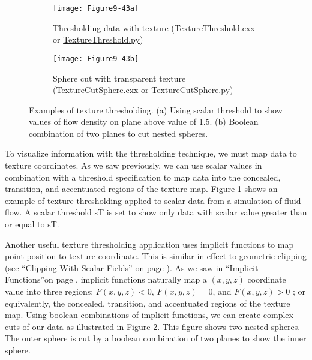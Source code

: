\begin{figure}[htb]
	\begin{subfigure}[h]{0.48\linewidth}
		\texttt{[image: Figure9-43a]}
		\captionsetup{justification=centering}
		\caption{Thresholding data with texture (\href{https://lorensen.github.io/VTKExamples/site/Cxx/Texture/TextureThreshold/}{TextureThreshold.cxx} or \href{https://lorensen.github.io/VTKExamples/site/Python/Texture/TextureThreshold/}{TextureThreshold.py})}
		\label{fig:Figure9-43a}
	\end{subfigure}
	\hfill
	\begin{subfigure}[h]{0.48\linewidth}
		\texttt{[image: Figure9-43b]}
		\captionsetup{justification=centering}
		\caption{Sphere cut with transparent texture (\href{https://lorensen.github.io/VTKExamples/site/Cxx/Texture/TextureCutSphere/}{TextureCutSphere.cxx} or \href{https://lorensen.github.io/VTKExamples/site/Python/Texture/TextureCutSphere/}{TextureCutSphere.py})}
		\label{fig:Figure9-43b}
	\end{subfigure}
	\caption{Examples of texture thresholding. (a) Using scalar threshold to show values of flow density on plane above value of 1.5. (b) Boolean combination of two planes to cut nested spheres.}\label{fig:Figure9-43}
\end{figure}

To visualize information with the thresholding technique, we must map data to texture coordinates. As we saw previously, we can use scalar values in combination with a threshold specification to map data into the concealed, transition, and accentuated regions of the texture map. Figure \ref{fig:Figure9-43a} shows an example of texture thresholding applied to scalar data from a simulation of fluid flow. A scalar threshold sT is set to show only data with scalar value greater than or equal to sT.

Another useful texture thresholding application uses implicit functions to map point position to texture coordinate. This is similar in effect to geometric clipping (see ``Clipping With Scalar Fields'' on page \pageref{subsec:clipping_with_scalar_fields}). As we saw in ``Implicit Functions''on page \pageref{subsec:implicit_functions}, implicit functions naturally map a $(x, y, z)$ coordinate value into three regions: $F(x, y, z) < 0$, $F(x, y, z) = 0$, and $F(x, y, z) > 0$ ; or equivalently, the concealed, transition, and accentuated regions of the texture map. Using boolean combinations of implicit functions, we can create complex cuts of our data as illustrated in Figure \ref{fig:Figure9-43b}. This figure shows two nested spheres. The outer sphere is cut by a boolean combination of two planes to show the inner sphere.

